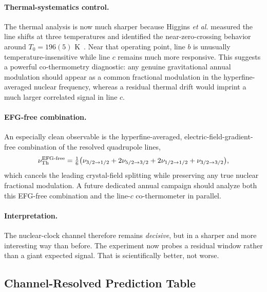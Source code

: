 \paragraph{Thermal-systematics control.}
The thermal analysis is now much sharper because Higgins \emph{et al.} measured the line shifts at three temperatures and identified the near-zero-crossing behavior around $T_0=196(5)$ K~\cite{Higgins2025}.  Near that operating point, line $b$ is unusually temperature-insensitive while line $c$ remains much more responsive.  This suggests a powerful co-thermometry diagnostic: any genuine gravitational annual modulation should appear as a common fractional modulation in the hyperfine-averaged nuclear frequency, whereas a residual thermal drift would imprint a much larger correlated signal in line $c$.

\paragraph{EFG-free combination.}
An especially clean observable is the hyperfine-averaged, electric-field-gradient-free combination of the resolved quadrupole lines,
\begin{equation}\label{eq:efg-free}
\nu_{\rm Th}^{\rm EFG\text{-}free}=\tfrac16\bigl(\nu_{3/2\to1/2}+2\nu_{5/2\to3/2}
+2\nu_{1/2\to1/2}+\nu_{3/2\to3/2}\bigr),
\end{equation}
which cancels the leading crystal-field splitting while preserving any true nuclear fractional modulation.  A future dedicated annual campaign should analyze both this EFG-free combination and the line-$c$ co-thermometer in parallel.

\paragraph{Interpretation.}
The nuclear-clock channel therefore remains \emph{decisive}, but in a sharper and more interesting way than before.  The experiment now probes a residual window rather than a giant expected signal.  That is scientifically better, not worse.

\subsection{Channel-Resolved Prediction Table}\label{sec:clocks-hierarchy}

